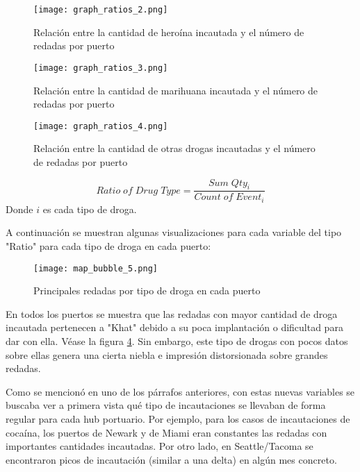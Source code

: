 \documentclass[12pt]{article}
\begin{document}
		\begin{figure}[H]
			\caption{\label{graph_ratios_2} Relación entre la cantidad de heroína incautada y el número de redadas por puerto}
			\centering
			\hspace*{1cm}
			\texttt{[image: graph\_ratios\_2.png]}
		\end{figure}
	
		\begin{figure}[H]
			\caption{\label{graph_ratios_3} Relación entre la cantidad de marihuana incautada y el número de redadas por puerto}
			\centering
			\hspace*{1cm}
			\texttt{[image: graph\_ratios\_3.png]}
		\end{figure}
	
		\begin{figure}[H]
			\caption{\label{graph_ratios_4} Relación entre la cantidad de otras drogas incautadas y el número de redadas por puerto}
			\centering
			\hspace*{1cm}
			\texttt{[image: graph\_ratios\_4.png]}
		\end{figure}
		
		$$
		Ratio\; of\; Drug\; Type = \frac{Sum\; Qty_i}{Count\; of\; Event_i}
		$$
		Donde $i$ es cada tipo de droga.
		
		A continuación se muestran algunas visualizaciones para cada variable del tipo "Ratio" para cada tipo de droga en cada puerto:
		
		\begin{figure}[H]
			\caption{\label{map_bubble_5} Principales redadas por tipo de droga en cada puerto}
			\centering
			\hspace*{1cm}
			\texttt{[image: map\_bubble\_5.png]}
		\end{figure}
		
		En todos los puertos se muestra que las redadas con mayor cantidad de droga incautada pertenecen a "Khat" debido a su poca implantación o dificultad para dar con ella. Véase la figura \ref{map_bubble_5}. Sin embargo, este tipo de drogas con pocos datos sobre ellas genera una cierta niebla e impresión distorsionada sobre grandes redadas.
		
		
		Como se mencionó en uno de los párrafos anteriores, con estas nuevas variables se buscaba ver a primera vista qué tipo de incautaciones se llevaban de forma regular para cada hub portuario. Por ejemplo, para los casos de incautaciones de cocaína, los puertos de Newark y de Miami eran constantes las redadas con importantes cantidades incautadas. Por otro lado, en Seattle/Tacoma se encontraron picos de incautación (similar a una delta) en algún mes concreto.
		
\end{document}
